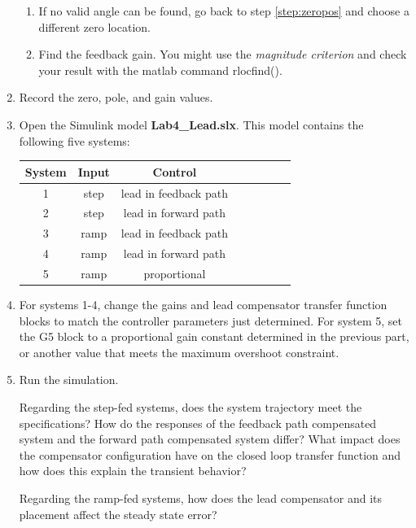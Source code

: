 \documentclass[11pt,a4paper]{article}
\begin{document}
\begin{enumerate}
\begin{enumerate}
\item If no valid angle can be found, go back to step \ref{step:zeropos} and choose a different zero location.

\item Find the feedback gain. You might use the \textit{magnitude criterion} and check your result with the matlab command rlocfind(). 

\end{enumerate}

\item Record the zero, pole, and gain values.

\item Open the Simulink model \textbf{Lab4\_Lead.slx}. This model contains the following five systems:

\begin{center}
\begin{tabular}{|c|c|c|c|c|c|c|c|}
\hline
System & Input & Control  \\ \hline
1 & step & lead in feedback path \\ \hline 
2 & step & lead in forward path \\ \hline 
3 & ramp & lead in feedback path \\ \hline 
4 & ramp & lead in forward path \\ \hline 
5 & ramp & proportional \\ \hline 
\end{tabular}
\end{center}


\item For systems 1-4, change the gains and lead compensator transfer function blocks to match the controller parameters just determined. For system 5, set the G5 block to a proportional gain constant determined in the previous part, or another value that meets the maximum overshoot constraint.

\item Run the simulation. 

Regarding the step-fed systems, does the system trajectory meet the specifications? How do the responses of the feedback path compensated system and the forward path compensated system differ? What impact does the compensator configuration have on the closed loop transfer function and how does this explain the transient behavior?

Regarding the ramp-fed systems, how does the lead compensator and its placement affect the steady state error?

\end{enumerate}
\end{document}

